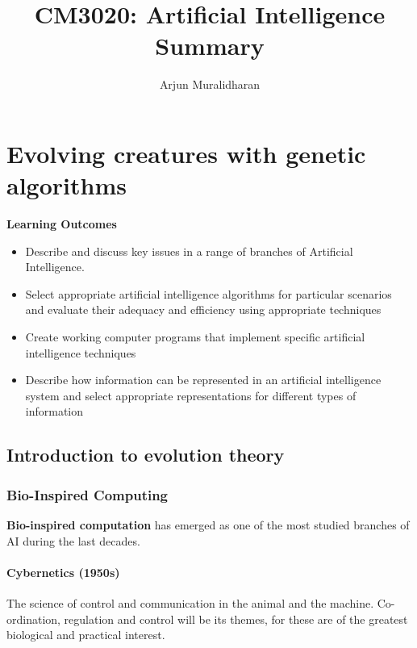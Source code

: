\title{CM3020: Artificial Intelligence \\ Summary}
\author{Arjun Muralidharan}



\section{Evolving creatures with genetic algorithms}
\begin{mdframed}
    \textbf{Learning Outcomes}
    \begin{itemize}[label={\checkmark}]
        \item Describe and discuss key issues in a range of branches of Artificial Intelligence.
        \item Select appropriate artificial intelligence algorithms for particular scenarios and evaluate their adequacy and efficiency using appropriate techniques
        \item Create working computer programs that implement specific artificial intelligence techniques
        \item Describe how information can be represented in an artificial intelligence system and select appropriate representations for different types of information
    \end{itemize}
\end{mdframed}

\subsection{Introduction to evolution theory}

\subsubsection{Bio-Inspired Computing}

\textbf{Bio-inspired computation} has emerged as one of the most studied branches of AI during the last decades.

\paragraph{Cybernetics (1950s)} The science of control and communication in the animal and the machine. Co-ordination, regulation and control will be its themes, for these are of the greatest biological and practical interest.

